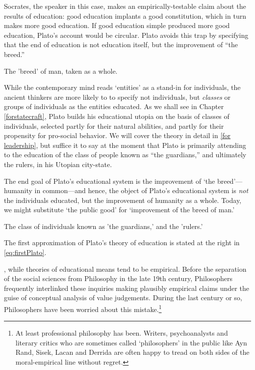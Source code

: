 Socrates, the speaker in this case, makes an empirically-testable claim about the results of education: good education implants a good constitution, which in turn makes more good education. If good education simple produced more good education, Plato's account would be circular. Plato avoids this trap by specifying that the end of education is not education itself, but the improvement of ``the breed.'' \begin{objects}The 'breed' of man, taken as a whole.\end{objects}

While the contemporary mind reads `entities' as a stand-in for individuals, the ancient thinkers are more likely to to specify not individuals, but \emph{classes} or groups of individuals as the entities educated. As we shall see in Chapter \ref{forstatecraft}, Plato builds his educational utopia on the basis of classes of individuals, selected partly for their natural abilities, and partly for their propensity for pro-social behavior. We will cover the theory in detail in \ref{for leadership}, but suffice it to say at the moment that Plato is primarily attending to the education of the class of people known as ``the guardians,'' and ultimately the rulers, in his Utopian city-state.

The end goal of Plato's educational system is the improvement of `the breed'---humanity in common---and hence, the object of Plato's educational system is \emph{not} the individuals educated, but the improvement of humanity as a whole. Today, we might substitute `the public good' for `improvement of the breed of man.' \begin{entities}The class of individuals known as 'the guardians,' and the 'rulers.'\end{entities} 

The first approximation of Plato's theory of education is stated at the right in \ref{eq:firstPlato}. 

, while theories of educational means tend to be empirical. Before the separation of the social sciences from Philosophy in the late 19th century, Philosophers frequently interlinked these inquiries making plausibly empirical claims under the guise of conceptual analysis of value judgements. During the last century or so, Philosophers have been worried about this mistake.\footnote{At least professional philosophy has been. Writers, psychoanalysts and literary critics who are sometimes called `philosophers' in the public like Ayn Rand, Sisek, Lacan and Derrida are often happy to tread on both sides of the moral-empirical line without regret.}

